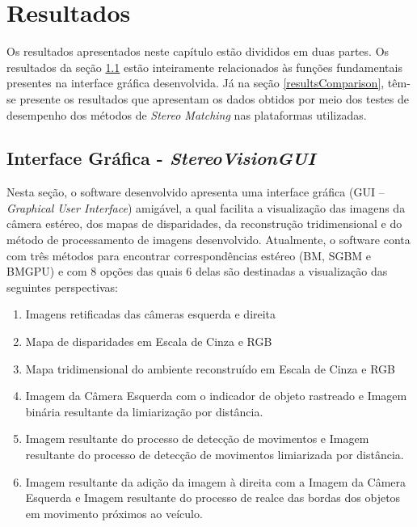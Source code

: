 \chapter{Resultados}
\label{Resultados}

Os resultados apresentados neste capítulo estão divididos em duas partes. Os resultados da seção \ref{resultsGUI} estão inteiramente relacionados às funções fundamentais presentes na interface gráfica desenvolvida. Já na seção \ref{resultsComparison}, têm-se presente os resultados que apresentam os dados obtidos por meio dos testes de desempenho dos métodos de \textit{Stereo Matching} nas plataformas utilizadas.

\section{Interface Gráfica - \textit{StereoVisionGUI}}
\label{resultsGUI}

Nesta seção, o software desenvolvido apresenta uma interface gráfica (GUI -- \textit{Graphical User Interface}) amigável, a qual facilita a visualização das imagens da câmera estéreo, 
dos mapas de disparidades, da reconstrução tridimensional e do método de processamento de imagens desenvolvido. Atualmente, o software conta com três métodos para encontrar correspondências 
estéreo (BM, SGBM e BMGPU) e com 8 opções das quais 6 delas são destinadas a visualização das seguintes perspectivas:

\begin{enumerate}
  \item Imagens retificadas das câmeras esquerda e direita
  \item Mapa de disparidades em Escala de Cinza e RGB
  \item Mapa tridimensional do ambiente reconstruído em Escala de Cinza e RGB
  \item Imagem da Câmera Esquerda com o indicador de objeto rastreado e Imagem binária resultante da limiarização por distância.
  \item Imagem resultante do processo de detecção de movimentos e Imagem resultante do processo de detecção de movimentos limiarizada por distância. 
  \item Imagem resultante da adição da imagem à direita com a Imagem da Câmera Esquerda e Imagem resultante do processo de realce das bordas dos objetos em movimento próximos ao veículo.
\end{enumerate} 

